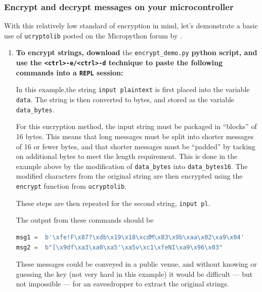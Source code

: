 \subsubsection{\howto Encrypt and decrypt messages on your microcontroller}
With this relatively low standard of encryption in mind, let's demonstrate a basic use of \lstinline{ucryptolib} posted on the Micropython forum by .
\begin{enumerate}
	\item \textbf{To encrypt strings, download} the \lstinline{encrypt_demo.py} \textbf{python script, and use the \lstinline{<ctrl>-e/<ctrl>-d} technique to paste the following commands into a \texttt{REPL} session:}


	In this example,the string \texttt{input plaintext} is first placed into the variable \lstinline{data}.
	The string is then converted to bytes, and stored as the variable \lstinline{data_bytes}.

	\smallskip
	For this encryption method, the input string must be packaged in ``blocks'' of 16 bytes.
	This means that long messages must be split into shorter messages of 16 or fewer bytes, and that shorter messages must be ``padded'' by tacking on additional bytes to meet the length requirement.
	This is done in the example above by the modification of \lstinline{data_bytes} into \lstinline{data_bytes16}.
	The modified characters from the original string are then encrypted using the \lstinline{encrypt} function from \lstinline{ucryptolib}.

	\smallskip
	These steps are then repeated for the second string, \texttt{input pl}.

	The output from these commands should be
\begin{lstlisting}[language=Python]
msg1 =  b'\xfe!F\x87?\xdb\x19\x18\xcdM\x83\x9b\xaa\x02\xa9\x04'
msg2 =  b"[\x9df\xa3\xa0\xa5'\xa5v\xc1\xfeNI\xa9\x96\x03"
\end{lstlisting}
	These messages could be conveyed in a public venue, and without knowing or guessing the key (not very hard in this example) it would be difficult --- but not impossible --- for an eavesdropper to extract the original strings.


\end{enumerate}

